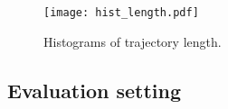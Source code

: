 \begin{figure}[t]
	\centering
	\texttt{[image: hist\_length.pdf]}
	\caption{Histograms of trajectory length.}
	\label{fig:hist_length}
\end{figure}








\subsection{Evaluation setting}
\label{ssec:methods}

